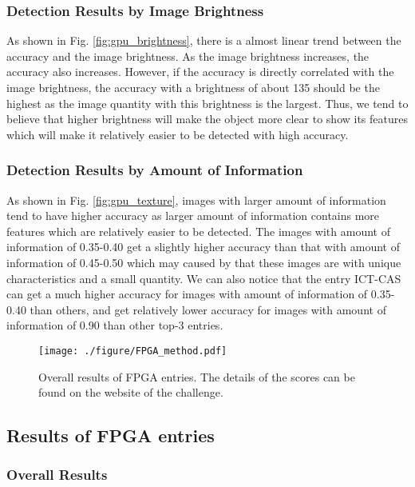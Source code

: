 \documentclass[10pt,journal,compsoc]{IEEEtran}
\begin{document}
\subsubsection{Detection Results by Image Brightness}\label{gpu_brightness}
As shown in Fig. \ref{fig:gpu_brightness}, there is a almost linear trend between the accuracy and the image brightness.
As the image brightness increases, the accuracy also increases.
However, if the accuracy is directly correlated with the image brightness, the accuracy with a brightness of about 135 should be the highest as the image quantity with this brightness is the largest.
Thus,
we tend to believe that higher brightness will make the object more clear to show its features which will make it relatively easier to be detected with high accuracy.



\subsubsection{Detection Results by Amount of Information}\label{gpu_texture}

As shown in Fig. \ref{fig:gpu_texture}, images with larger amount of information tend to have higher accuracy as larger amount of information contains more features which are relatively easier to be detected.
The images with amount of information of 0.35-0.40 get a slightly higher accuracy than that with amount of information of 0.45-0.50 which may caused by that these images are with unique characteristics and a small quantity.
We can also notice that the entry ICT-CAS can get a much higher accuracy for images with amount of information of 0.35-0.40 than others, and get relatively lower accuracy for images with amount of information of 0.90 than other top-3 entries.

\begin{figure}
\centering
  \texttt{[image: ./figure/FPGA\_method.pdf]}
    \caption{Overall results of FPGA entries. The details of the scores can be found on the website of the challenge.}
  \label{fig:FPGA_by_method}
\end{figure}

\subsection{Results of FPGA entries}
\subsubsection{Overall Results}
\end{document}

